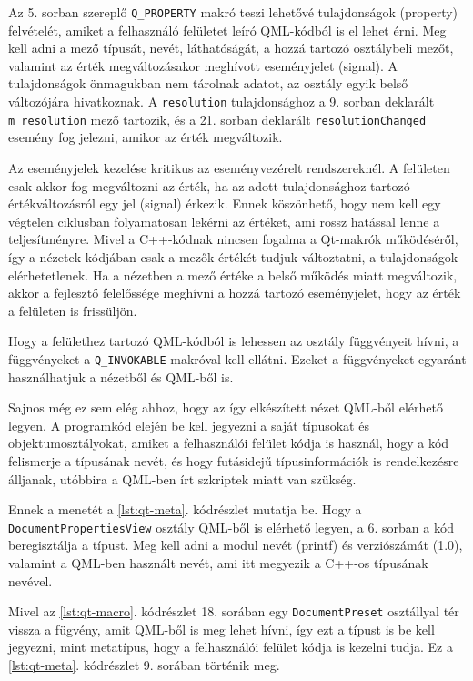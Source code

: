 Az 5. sorban szereplő \texttt{Q\_PROPERTY} makró teszi lehetővé tulajdonságok (property) felvételét, amiket a felhasználó felületet leíró QML-kódból is el lehet érni. 
Meg kell adni a mező típusát, nevét, láthatóságát, a hozzá tartozó osztálybeli mezőt, valamint az érték megváltozásakor meghívott eseményjelet (signal).
A tulajdonságok önmagukban nem tárolnak adatot, az osztály egyik belső változójára hivatkoznak. A \texttt{resolution} tulajdonsághoz a 9. sorban deklarált \texttt{m\_resolution} mező tartozik, és a 21. sorban deklarált \texttt{resolutionChanged} esemény fog jelezni, amikor az érték megváltozik.

Az eseményjelek kezelése kritikus az eseményvezérelt rendszereknél. A felületen csak akkor fog megváltozni az érték, ha az adott tulajdonsághoz tartozó értékváltozásról egy jel (signal) érkezik. Ennek köszönhető, hogy nem kell egy végtelen ciklusban folyamatosan lekérni az értéket, ami rossz hatással lenne a teljesítményre. 
Mivel a C++-kódnak nincsen fogalma a Qt-makrók működéséről, így a nézetek kódjában csak a mezők értékét tudjuk változtatni, a tulajdonságok elérhetetlenek. Ha a nézetben a mező értéke a belső működés miatt megváltozik, akkor a fejlesztő felelőssége meghívni a hozzá tartozó eseményjelet, hogy az érték a felületen is frissüljön.

Hogy a felülethez tartozó QML-kódból is lehessen az osztály függvényeit hívni, a függvényeket a \texttt{Q\_INVOKABLE} makróval kell ellátni. Ezeket a függvényeket egyaránt használhatjuk a nézetből és QML-ből is.

Sajnos még ez sem elég ahhoz, hogy az így elkészített nézet QML-ből elérhető legyen.
A programkód elején be kell jegyezni a saját típusokat és objektumosztályokat, amiket a felhasználói felület kódja is használ, hogy a kód felismerje a típusának nevét, és hogy futásidejű típusinformációk is rendelkezésre álljanak, utóbbira a QML-ben írt szkriptek miatt van szükség. 

Ennek a menetét a \ref{lst:qt-meta}. kódrészlet mutatja be. Hogy a \texttt{DocumentPropertiesView} osztály QML-ből is elérhető legyen, a 6. sorban a kód beregisztálja a típust. Meg kell adni a modul nevét (printf) és verziószámát (1.0), valamint a QML-ben használt nevét, ami itt megyezik a C++-os típusának nevével.

Mivel az \ref{lst:qt-macro}. kódrészlet 18. sorában egy \texttt{DocumentPreset} osztállyal tér vissza a fügvény, amit QML-ből is meg lehet hívni, így ezt a típust is be kell jegyezni, mint metatípus, hogy a felhasználói felület kódja is kezelni tudja. Ez a \ref{lst:qt-meta}. kódrészlet 9. sorában történik meg.


